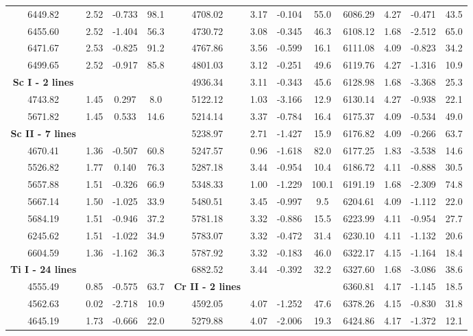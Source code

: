 \documentclass[dvips,12pt,a4paper]{report}
\begin{document}
{{\begin{table}[h]
\begin{tabular}{c c c c | c c c c | c c c c}
6449.82 & 2.52 & -0.733 &  98.1 & 4708.02 & 3.17 & -0.104 &  55.0 & 6086.29 & 4.27 & -0.471 &  43.5 \\
6455.60 & 2.52 & -1.404 &  56.3 & 4730.72 & 3.08 & -0.345 &  46.3 & 6108.12 & 1.68 & -2.512 &  65.0 \\
6471.67 & 2.53 & -0.825 &  91.2 & 4767.86 & 3.56 & -0.599 &  16.1 & 6111.08 & 4.09 & -0.823 &  34.2 \\
6499.65 & 2.52 & -0.917 &  85.8 & 4801.03 & 3.12 & -0.251 &  49.6 & 6119.76 & 4.27 & -1.316 &  10.9 \\
\textbf{Sc I - 2 lines} &  & &  & 4936.34 & 3.11 & -0.343 &  45.6 & 6128.98 & 1.68 & -3.368 &  25.3 \\
4743.82 & 1.45 &  0.297 &   8.0 & 5122.12 & 1.03 & -3.166 &  12.9 & 6130.14 & 4.27 & -0.938 &  22.1 \\
5671.82 & 1.45 &  0.533 &  14.6 & 5214.14 & 3.37 & -0.784 &  16.4 & 6175.37 & 4.09 & -0.534 &  49.0 \\
\textbf{Sc II - 7 lines} &  & & & 5238.97 & 2.71 & -1.427 &  15.9 & 6176.82 & 4.09 & -0.266 &  63.7 \\
4670.41 & 1.36 & -0.507 &  60.8 & 5247.57 & 0.96 & -1.618 &  82.0 & 6177.25 & 1.83 & -3.538 &  14.6 \\
5526.82 & 1.77 &  0.140 &  76.3 & 5287.18 & 3.44 & -0.954 &  10.4 & 6186.72 & 4.11 & -0.888 &  30.5 \\
5657.88 & 1.51 & -0.326 &  66.9 & 5348.33 & 1.00 & -1.229 & 100.1 & 6191.19 & 1.68 & -2.309 &  74.8 \\
5667.14 & 1.50 & -1.025 &  33.9 & 5480.51 & 3.45 & -0.997 &   9.5 & 6204.61 & 4.09 & -1.112 &  22.0 \\
5684.19 & 1.51 & -0.946 &  37.2 & 5781.18 & 3.32 & -0.886 &  15.5 & 6223.99 & 4.11 & -0.954 &  27.7 \\
6245.62 & 1.51 & -1.022 &  34.9 & 5783.07 & 3.32 & -0.472 &  31.4 & 6230.10 & 4.11 & -1.132 &  20.6 \\
6604.59 & 1.36 & -1.162 &  36.3 & 5787.92 & 3.32 & -0.183 &  46.0 & 6322.17 & 4.15 & -1.164 &  18.4 \\
\textbf{Ti I - 24 lines} &  & & & 6882.52 & 3.44 & -0.392 &  32.2 & 6327.60 & 1.68 & -3.086 &  38.6 \\
4555.49 & 0.85 & -0.575 &  63.7 & \textbf{Cr II - 2 lines} & & &  & 6360.81 & 4.17 & -1.145 &  18.5 \\
4562.63 & 0.02 & -2.718 &  10.9 & 4592.05 & 4.07 & -1.252 &  47.6 & 6378.26 & 4.15 & -0.830 &  31.8 \\
4645.19 & 1.73 & -0.666 &  22.0 & 5279.88 & 4.07 & -2.006 &  19.3 & 6424.86 & 4.17 & -1.372 &  12.1 \\

\end{tabular}
\end{table}}}
\end{document}
